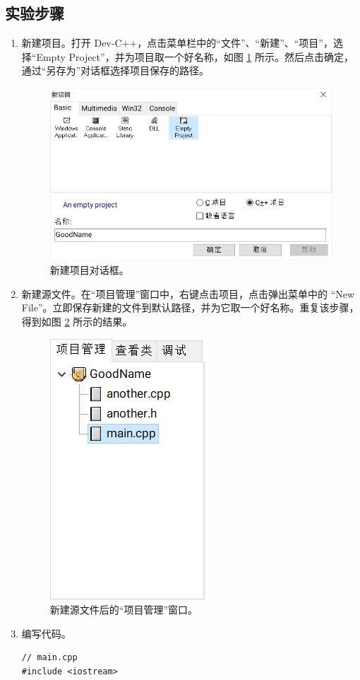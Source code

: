 \subsection*{实验步骤}

\begin{enumerate}
	\item 新建项目。打开 Dev-C++，点击菜单栏中的“文件”、“新建”、“项目”，选择“Empty Project”，并为项目取一个好名称，如图 \ref{fig:multi-source-1} 所示。然后点击确定，通过“另存为”对话框选择项目保存的路径。

	\begin{figure}
		\centering
		\includegraphics[width=0.75\linewidth]{assets/multi-source-1}
		\caption{新建项目对话框。}
		\label{fig:multi-source-1}
	\end{figure}

	\item 新建源文件。在“项目管理”窗口中，右键点击项目，点击弹出菜单中的 “New File”。立即保存新建的文件到默认路径，并为它取一个好名称。重复该步骤，得到如图 \ref{fig:multi-source-2} 所示的结果。

	\begin{figure}
		\centering
		\includegraphics[width=0.2\linewidth]{assets/multi-source-2}
		\caption{新建源文件后的“项目管理”窗口。}
		\label{fig:multi-source-2}
	\end{figure}

	\item 编写代码。

	\begin{lstlisting}[language={[17]C++}, moreemph={[2]another}]
// main.cpp
#include <iostream>


\end{lstlisting}
\end{enumerate}
